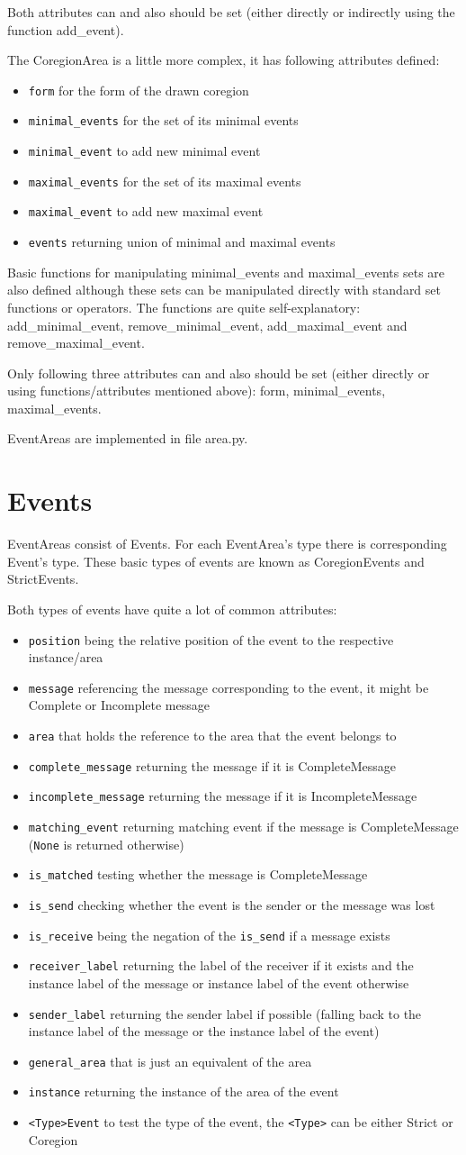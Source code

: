 \documentclass[11pt,oneside]{fithesis2}
\newcommand{\T}[1]{\texttt{#1}}
\newcommand{\ite}[1]{\item{\texttt{#1}}}
\begin{document}
Both attributes can and also should be set (either directly or indirectly using the function add\_event).

The CoregionArea is a little more complex, it has following attributes defined:
\begin{itemize}
\ite{form} for the form of the drawn coregion
\ite{minimal\_events} for the set of its minimal events
\ite{minimal\_event} to add new minimal event
\ite{maximal\_events} for the set of its maximal events
\ite{maximal\_event} to add new maximal event
\ite{events} returning union of minimal and maximal events
\end{itemize}

Basic functions for manipulating minimal\_events and maximal\_events sets are also defined although these sets can be manipulated directly with standard set functions or operators. The functions are quite self-explanatory: add\_minimal\_event, remove\_minimal\_event, add\_maximal\_event and remove\_maximal\_event.

Only following three attributes can and also should be set (either directly or using functions/attributes mentioned above): form, minimal\_events, maximal\_events.

EventAreas are implemented in file area.py.


\section{Events}
EventAreas consist of Events. For each EventArea's type there is corresponding Event's type. These basic types of events are known as CoregionEvents and StrictEvents.

Both types of events have quite a lot of common attributes:
\begin{itemize}
\ite{position} being the relative position of the event to the respective instance/area
\ite{message} referencing the message corresponding to the event, it might be Complete or Incomplete message
\ite{area} that holds the reference to the area that the event belongs to
\ite{complete\_message} returning the message if it is CompleteMessage
\ite{incomplete\_message} returning the message if it is IncompleteMessage
\ite{matching\_event} returning matching event if the message is CompleteMessage (\T{None} is returned otherwise)
\ite{is\_matched} testing whether the message is CompleteMessage
\ite{is\_send} checking whether the event is the sender or the message was lost
\ite{is\_receive} being the negation of the \T{is\_send} if a message exists
\ite{receiver\_label} returning the label of the receiver if it exists and the instance label of the message or instance label of the event otherwise
\ite{sender\_label} returning the sender label if possible (falling back to the instance label of the message or the instance label of the event)
\ite{general\_area} that is just an equivalent of the area
\ite{instance} returning the instance of the area of the event
\ite{<Type>Event} to test the type of the event, the \T{<Type>} can be either Strict or Coregion
\end{itemize}
\end{document}
